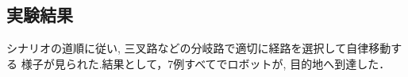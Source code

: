 
\subsection{実験結果}
シナリオの道順に従い, 三叉路などの分岐路で適切に経路を選択して自律移動する
様子が見られた.結果として，7例すべてでロボットが, 目的地へ到達した．